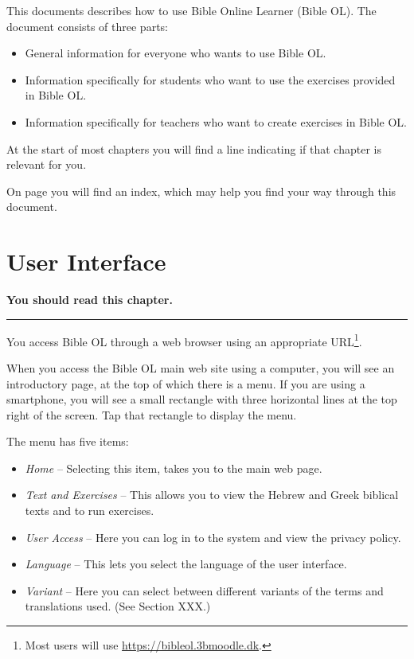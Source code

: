 \documentclass[11pt,oneside,a4paper]{memoir}
\begin{document}
This documents describes how to use Bible Online Learner (Bible OL). The document consists of three
parts:

\begin{itemize}
\item General information for everyone who wants to use Bible OL.
\item Information specifically for students who want to use the exercises provided in Bible OL.
\item Information specifically for teachers who want to create exercises in Bible OL.
\end{itemize}

At the start of most chapters you will find a line indicating if that chapter is relevant for you.

On page \pageref{sec-index} you will find an index, which may help you find your way through this document.

\chapter{User Interface}

\textbf{You should read this chapter.}
\plainbreak{3}

You access Bible OL through a web browser using an appropriate
URL\footnote{Most users will use \url{https://bibleol.3bmoodle.dk}.}.

When you access the Bible OL main web site using a computer, you will see an introductory page,
at the top of which there is a menu. If you are using a smartphone, you will see a small rectangle with
three horizontal lines at the top right of the screen. Tap that rectangle to display the menu.


The menu has five items:

\begin{itemize}
\item \emph{Home} -- Selecting this item, takes you to the main web page.
\item \emph{Text and Exercises} -- This allows you to view the Hebrew and Greek biblical texts and to run exercises.
\item \emph{User Access} -- Here you can log in to the system and view the privacy policy.
\item \emph{Language} -- This lets you select the language of the user interface.
\item \emph{Variant} -- Here you can select between different variants of the terms and translations used. (See Section XXX.)
\end{itemize}
\end{document}
